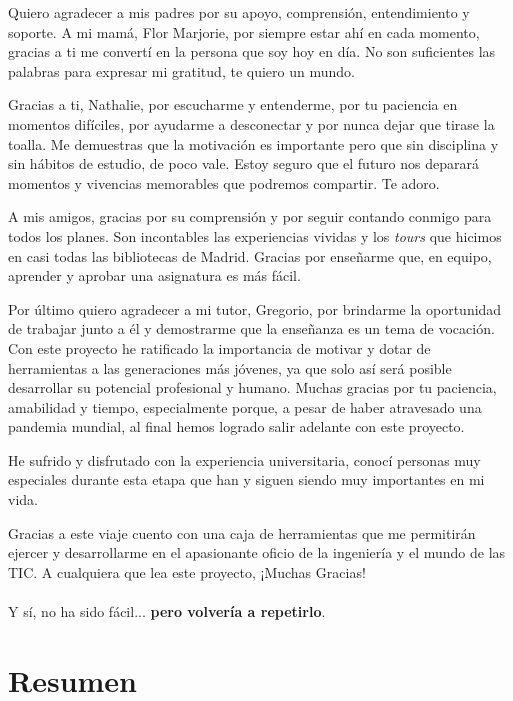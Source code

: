 \documentclass[a4paper, 12pt]{book}
\begin{document}
Quiero agradecer a mis padres por su apoyo, comprensión, entendimiento y soporte. A mi mamá, Flor Marjorie, por siempre estar ahí en cada momento, gracias a ti me convertí en la persona que soy hoy en día. No son suficientes las palabras para expresar mi gratitud, te quiero un mundo. 

Gracias a ti, Nathalie, por escucharme y entenderme, por tu paciencia en momentos difíciles, por ayudarme a desconectar y por nunca dejar que tirase la toalla. Me demuestras que la motivación es importante pero que sin disciplina y sin hábitos de estudio, de poco vale. Estoy seguro que el futuro nos deparará momentos y vivencias memorables que podremos compartir. Te adoro.

A mis amigos, gracias por su comprensión y por seguir contando conmigo para todos los planes. Son incontables las experiencias vividas y los \textit{tours} que hicimos en casi todas las bibliotecas de Madrid. Gracias por enseñarme que, en equipo, aprender y aprobar una asignatura es más fácil.

Por último quiero agradecer a mi tutor, Gregorio, por brindarme la oportunidad de trabajar junto a él y demostrarme que la enseñanza es un tema de vocación. Con este proyecto he ratificado la importancia de motivar y dotar de herramientas a las generaciones más jóvenes, ya que solo así será posible desarrollar su potencial profesional y humano. Muchas gracias por tu paciencia, amabilidad y tiempo, especialmente porque, a pesar de haber atravesado una pandemia mundial, al final hemos logrado salir adelante con este proyecto.

He sufrido y disfrutado con la experiencia universitaria, conocí personas muy especiales durante esta etapa que han y siguen siendo muy importantes en mi vida. 

Gracias a este viaje cuento con una caja de herramientas que me permitirán ejercer y desarrollarme en el apasionante oficio de la ingeniería y el mundo de las TIC.
A cualquiera que lea este proyecto, ¡Muchas Gracias!
\\\\
Y sí, no ha sido fácil... \textbf{pero volvería a repetirlo}.\\

\chapter*{Resumen}
\end{document}
